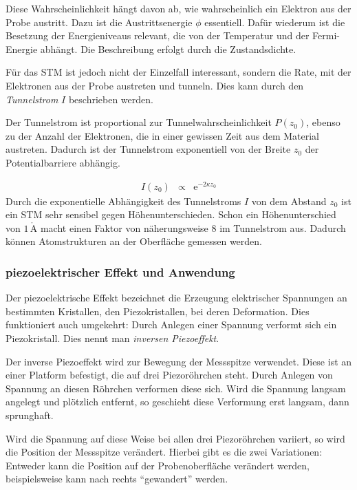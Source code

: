 \documentclass[12pt,a4paper]{scrartcl}
\numberwithin{equation}{section} %
\begin{document}
Diese Wahrscheinlichkeit hängt davon ab, wie wahrscheinlich ein Elektron aus der Probe austritt. Dazu ist die Austrittsenergie $\phi$ essentiell. Dafür wiederum ist die Besetzung der Energieniveaus relevant, die von der Temperatur und der Fermi-Energie abhängt. Die
Beschreibung erfolgt durch die Zustandsdichte.

Für das STM ist jedoch nicht der Einzelfall interessant, sondern die Rate, mit der Elektronen aus der Probe austreten und tunneln. Dies kann durch den \emph{Tunnelstrom} $I$ beschrieben werden.

Der Tunnelstrom ist proportional zur Tunnelwahrscheinlichkeit $P(z_0)$, ebenso zu der Anzahl der Elektronen, die in einer gewissen Zeit aus dem Material austreten. Dadurch ist der Tunnelstrom exponentiell von der Breite $z_0$ der Potentialbarriere abhängig.

\begin{eqnarray}
    I(z_0) &\propto& \mathrm e^{-2\kappa z_0} \label{eq:Tunnelstrom}
\end{eqnarray}
Durch die exponentielle Abhängigkeit des Tunnelstroms $I$ von dem Abstand $z_0$ ist ein STM sehr sensibel gegen Höhenunterschieden. Schon ein Höhenunterschied von $1\,\mathrm{\mathring{A}}$ macht einen Faktor von näherungsweise $8$ im Tunnelstrom aus. \cite{Anleitung} Dadurch können Atomstrukturen an der Oberfläche gemessen werden.

\hypertarget{piezoelektrischer-effekt-und-anwendung}{%
\subsubsection{piezoelektrischer Effekt und
Anwendung}\label{piezoelektrischer-effekt-und-anwendung}}

Der piezoelektrische Effekt bezeichnet die Erzeugung elektrischer Spannungen an bestimmten Kristallen, den Piezokristallen, bei deren Deformation. Dies funktioniert auch umgekehrt: Durch Anlegen einer Spannung verformt sich ein Piezokristall. Dies nennt man \emph{inversen Piezoeffekt}.

Der inverse Piezoeffekt wird zur Bewegung der Messspitze verwendet. Diese ist an einer Platform befestigt, die auf drei Piezoröhrchen steht. Durch Anlegen von Spannung an diesen Röhrchen verformen diese sich. Wird die Spannung langsam angelegt und plötzlich entfernt, so geschieht diese Verformung erst langsam, dann sprunghaft.

Wird die Spannung auf diese Weise bei allen drei Piezoröhrchen variiert, so wird die Position der Messspitze verändert. Hierbei gibt es die zwei Variationen: Entweder kann die Position auf der Probenoberfläche verändert werden, beispielsweise kann nach rechts ``gewandert'' werden.
\end{document}
